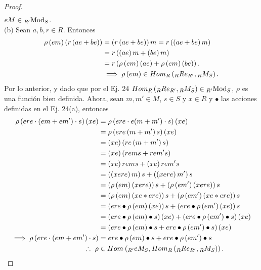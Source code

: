 \documentclass{article}
\newcommand{\lrprth}[1]{
	\left(#1\right)
}
\newcommand{\ringbimod}[4]{
	\if#4l
	{}_{#1-#2}#3
	\else
	\if#4r
	#3_{#1-#2}
	\else 
	\ifstrequal{#4}{lr}{
		{}_{#1}#3_{#2}
	}
	\fi
	\fi
}
\newcommand{\ringmodhom}[3]{
	Hom_{#1}\lrprth{#2,#3}
}
\theoremstyle{definition}
\theoremstyle{plain}
\theoremstyle{plain}
\theoremstyle{definition}
\theoremstyle{definition}
\theoremstyle{definition}
\theoremstyle{definition}
\theoremstyle{definition}
\theoremstyle{definition}
\begin{document}
\begin{enumerate}[label=\textbf{Ej \arabic*.}]
\begin{proof}
\begin{align*}
	\end{align*}
	$eM\in\ringbimod{R'}{S}{\text{Mod}}{lr}$.\\
	$\boxed{\text{(b)}}$ Sean $a,b,r\in R$. Entonces
	\begin{align*}
		{\rho\lrprth{em}}\lrprth{r\lrprth{ae+be}}&=\lrprth{r\lrprth{ae+be}}m=r\lrprth{\lrprth{ae+be}m}\\
		&=r\lrprth{\lrprth{ae}m+\lrprth{be}m}\\
		&=r\lrprth{\rho\lrprth{em}(ae)+\rho\lrprth{em}(be)}.\\
		&\implies \rho\lrprth{em}\in\ringmodhom{R}{\ringbimod{R}{R'}{Re}{lr}}{\ringbimod{R}{S}{M}{lr}}.
	\end{align*}
	Por lo anterior, y dado que por el Ej. 24  $\ringmodhom{R}{\ringbimod{R}{R'}{Re}{lr}}{\ringbimod{R}{S}{M}{lr}}\in\ringbimod{R'}{S}{\text{Mod}}{lr}$, $\rho$ es una función bien definida. Ahora, sean $m,m'\in M$, $s\in S$ y $x\in R$ y $\bullet$ las acciones definidas en el Ej. 24(a), entonces 
	\begin{align*}
		\rho\lrprth{ere\cdot\lrprth{em+em'}\cdot s}\lrprth{xe}&=\rho\lrprth{{ere}\cdot{e{\lrprth{m+m'}}\cdot s}}(xe)\\
		&=\rho\lrprth{ere\lrprth{m+m'}s}(xe)\\
		&=\lrprth{xe}\lrprth{re\lrprth{m+m'}s}\\
		&=\lrprth{xe}\lrprth{rems+rem's}\\
		&=\lrprth{xe}{rems}+\lrprth{xe}{rem's}\\
		&=\lrprth{\lrprth{xere}m}s+\lrprth{\lrprth{xere}m'}s\\
		&=\lrprth{\rho\lrprth{em}\lrprth{xere}}s+\lrprth{\rho\lrprth{em'}\lrprth{xere}}s\\
		&=\lrprth{\rho\lrprth{em}\lrprth{xe*ere}}s+\lrprth{\rho\lrprth{em'}\lrprth{xe*ere}}s\\
		&=\lrprth{ere\bullet\rho\lrprth{em}\lrprth{xe}}s+\lrprth{ere\bullet\rho\lrprth{em'}\lrprth{xe}}s\\
		&=\lrprth{ere\bullet\rho\lrprth{em}\bullet s}\lrprth{xe}+\lrprth{ere\bullet\rho\lrprth{em'}\bullet s}\lrprth{xe}\\
		&=\lrprth{ere\bullet\rho\lrprth{em}\bullet s+ere\bullet\rho\lrprth{em'}\bullet s}\lrprth{xe}\\
		\implies \rho\lrprth{{ere}\cdot\lrprth{em+em'}\cdot s}&=ere\bullet\rho\lrprth{em}\bullet s+ere\bullet\rho\lrprth{em'}\bullet s\\
		\therefore\  \rho&\in\ringmodhom{}{\ringbimod{R'}{S}{eM}{lr}}{\ringmodhom{R}{\ringbimod{R}{R'}{Re}{lr}}{\ringbimod{R}{S}{M}{lr}}}.

\end{align*}
\end{proof}
\end{enumerate}
\end{document}
